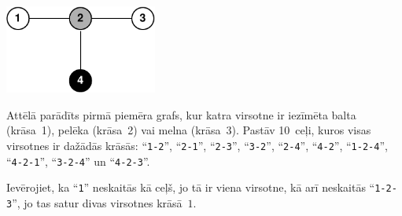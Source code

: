 \section*{}

\includegraphics[width=5cm]{pathsfig.pdf}
\nopagebreak

Attēlā parādīts pirmā piemēra grafs, kur katra virsotne ir iezīmēta balta (krāsa~1), pelēka (krāsa~2) vai melna (krāsa~3). Pastāv 10~ceļi, kuros visas virsotnes ir dažādās krāsās: ``\texttt{1-2}'', ``\texttt{2-1}'', ``\texttt{2-3}'', ``\texttt{3-2}'', ``\texttt{2-4}'', ``\texttt{4-2}'', ``\texttt{1-2-4}'', ``\texttt{4-2-1}'', ``\texttt{3-2-4}'' un ``\texttt{4-2-3}''.

Ievērojiet, ka ``\texttt{1}'' neskaitās kā ceļš, jo tā ir viena virsotne, kā arī neskaitās ``\texttt{1-2-3}'', jo tas satur divas virsotnes krāsā~$1$.
